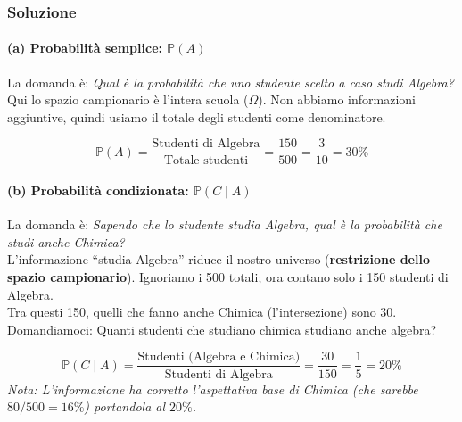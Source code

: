 \begin{esempio}
\begin{center}
\end{center}

\subsubsection*{Soluzione}

\paragraph{(a) Probabilità semplice: $\mathbb{P}(A)$}
La domanda è: \emph{Qual è la probabilità che uno studente scelto a caso studi Algebra?}
\\Qui lo spazio campionario è l'intera scuola ($\Omega$). Non abbiamo informazioni aggiuntive, quindi usiamo il totale degli studenti come denominatore.

\[
\mathbb{P}(A) = \frac{\text{Studenti di Algebra}}{\text{Totale studenti}} = \frac{150}{500} = \frac{3}{10} = 30\%
\]

\paragraph{(b) Probabilità condizionata: $\mathbb{P}(C \mid A)$}
La domanda è: \emph{Sapendo che lo studente studia Algebra, qual è la probabilità che studi anche Chimica?}
\\L'informazione ``studia Algebra'' riduce il nostro universo (\textbf{restrizione dello spazio campionario}). Ignoriamo i 500 totali; ora contano solo i 150 studenti di Algebra.
\\Tra questi 150, quelli che fanno anche Chimica (l'intersezione) sono 30.
\\Domandiamoci: Quanti studenti che studiano chimica studiano anche algebra?

\[
\mathbb{P}(C \mid A) = \frac{\text{Studenti (Algebra e Chimica)}}{\text{Studenti di Algebra}} = \frac{30}{150} = \frac{1}{5} = 20\%
\]
\emph{Nota: L'informazione ha corretto l'aspettativa base di Chimica (che sarebbe $80/500 = 16\%$) portandola al $20\%$.}


\end{esempio}
